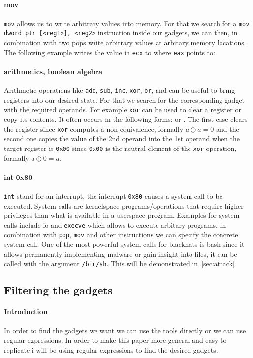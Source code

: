 \documentclass[journal=tosc,submission, notanonymous]{iacrtrans}
\begin{document}
\paragraph{mov}
\Verb+mov+ allows us to write arbitrary values into memory. For that we search for a \Verb+mov dword ptr [<reg1>], <reg2>+ instruction inside our gadgets, we can then, in combination with two pops write arbitrary values at arbitary memory locations. The following example writes the value in \Verb+ecx+ to where \Verb+eax+ points to: 
\paragraph{arithmetics, boolean algebra}
Arithmetic operations like \Verb+add+, \Verb+sub+, \Verb+inc+, \Verb+xor+, \Verb+or+, and can be useful to bring registers into our desired state. For that we search for the corresponding gadget with the required operands. For example \Verb+xor+ can be used to clear a register or copy its contents. It often occurs in the following forms:  or . The first case clears the register since \Verb+xor+ computes a non-equivalence, formally $a \oplus a = 0$ and the second one copies the value of the 2nd operand into the 1st operand when the target register is \Verb+0x00+ since \Verb+0x00+ is the neutral element of the \Verb+xor+ operation, formally $a \oplus 0 = a$.
\paragraph{int 0x80}
\Verb+int+ stand for an interrupt, the interrupt \Verb+0x80+ causes a system call to be executed. System calls are kernelspace programs/operations that require higher privileges than what is available in a userspace program. Examples for system calls include io and \Verb+execve+ which allows to execute arbitary programs. In combination with \Verb+pop+, \Verb+mov+ and other instructions we can specify the concrete system call. One of the most powerful system calls for blackhats is bash since it allows permanently implementing malware or gain insight into files, it can be called with the argument \Verb+/bin/sh+. This will be demonstrated in~\cref{sec:attack}
\subsection{Filtering the gadgets}
\paragraph{Introduction}
In order to find the gadgets we want we can use the tools directly or we can use regular expressions. In order to make this paper more general and easy to replicate i will be using regular expressions to find the desired gadgets.
\end{document}

